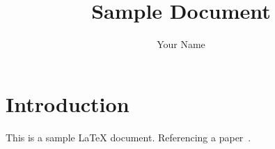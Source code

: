\documentclass{article}
\title{Sample Document}
\author{Your Name}
\begin{document}
\maketitle

\section{Introduction}
This is a sample LaTeX document. Referencing a paper~\cite{sample2024}.

\end{document}
